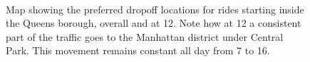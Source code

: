 \documentclass{acm_proc_article-sp-sigmod09}
\begin{document}
\begin{figure}
	\centering
	\\
	\caption{Map showing the preferred dropoff locations for rides starting inside the Queens borough, overall and at 12. Note how at 12 a consistent part of the traffic goes to the Manhattan district under Central Park. This movement remains constant all day from 7 to 16.}
\end{figure}
\end{document}
